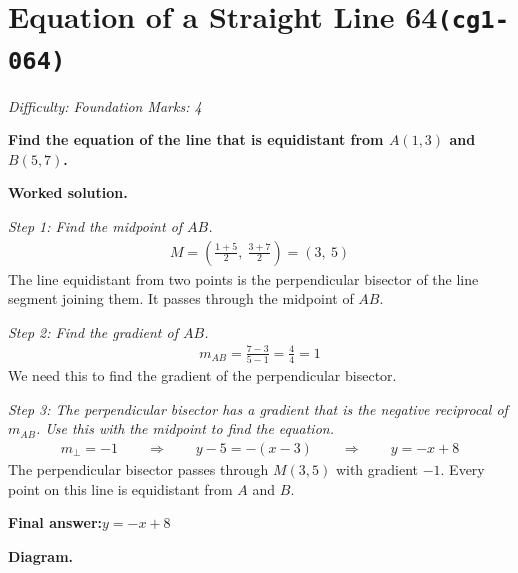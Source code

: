 \documentclass[11pt]{article}
\newcommand{\question}[1]{\par\medskip\noindent\textbf{#1}\par}
\begin{document}
\section*{Equation of a Straight Line 64\quad\small\texttt{(cg1-064)}}
\textit{Difficulty: Foundation \quad\textbar\quad Marks: 4}

\question{Find the equation of the line that is equidistant from \( A(1, 3) \) and \( B(5, 7) \).}

\textbf{Worked solution.}

\textit{Step 1: Find the midpoint of \(AB\).}
\[\begin{gathered}
M = \left(\frac{1+5}{2},\ \frac{3+7}{2}\right) = (3,\ 5)
\end{gathered}\]
The line equidistant from two points is the perpendicular bisector of the line segment joining them. It passes through the midpoint of \(AB\).

\textit{Step 2: Find the gradient of \(AB\).}
\[\begin{gathered}
m_{AB} = \frac{7-3}{5-1} = \frac{4}{4} = 1
\end{gathered}\]
We need this to find the gradient of the perpendicular bisector.

\textit{Step 3: The perpendicular bisector has a gradient that is the negative reciprocal of \(m_{AB}\). Use this with the midpoint to find the equation.}
\[\begin{gathered}
m_{\perp} = -1 \quad\quad \Rightarrow \quad\quad y - 5 = -(x - 3) \quad\quad \Rightarrow \quad\quad y = -x + 8
\end{gathered}\]
The perpendicular bisector passes through \(M(3, 5)\) with gradient \(-1\). Every point on this line is equidistant from \(A\) and \(B\).

\begin{answerbox}
\textbf{Final answer:}\quad \(\displaystyle y = -x + 8\)
\end{answerbox}
\textbf{Diagram.}
\end{document}
